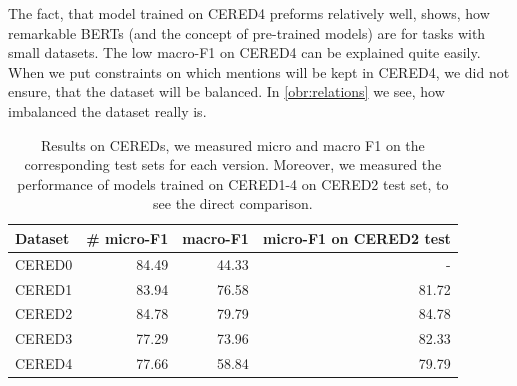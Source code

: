 The fact, that model trained on CERED4 preforms relatively well, shows, how remarkable BERTs (and the concept of pre-trained models) are for tasks with small datasets. The low macro-F1 on CERED4 can be explained quite easily. When we put constraints on which mentions will be kept in CERED4, we did not ensure, that the dataset will be balanced. In \autoref{obr:relations} we see, how imbalanced the dataset really is.





\begin{table}[h]

\caption{Results on CEREDs, we measured micro and macro F1 on the corresponding test sets for each version. Moreover, we measured the performance of models trained on CERED1-4 on CERED2 test set, to see the direct comparison.}

\label{table:CEREDsResults}

\begin{tabular}{p{} r r r }

\hline
Dataset & \# micro-F1 & macro-F1 & micro-F1 on CERED2 test \\
\hline
\hline
CERED0 & 84.49 & 44.33 & -\\
CERED1 & 83.94 & 76.58 & 81.72 \\
CERED2 & 84.78 & 79.79 & 84.78 \\
CERED3 & 77.29 & 73.96 & 82.33 \\
CERED4 & 77.66 & 58.84 & 79.79 \\
\hline


\end{tabular}

\end{table}


